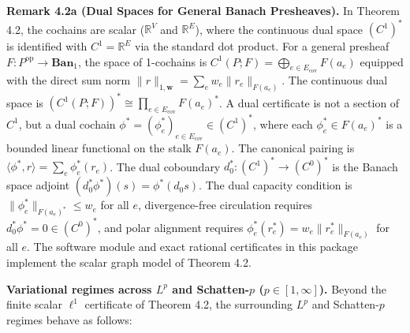\documentclass[
]{article}
\begin{document}
\textbf{Remark 4.2a (Dual Spaces for General Banach Presheaves).} In Theorem 4.2, the cochains are scalar (\(\mathbb{R}^V\) and \(\mathbb{R}^E\)), where the continuous dual space \((C^1)^*\) is identified with \(C^1 = \mathbb{R}^E\) via the standard dot product. For a general presheaf \(F: P^{\mathrm{op}} \to \mathbf{Ban}_1\), the space of 1-cochains is \(C^1(P; F) = \bigoplus_{e \in E_{\mathrm{cov}}} F(a_e)\) equipped with the direct sum norm \(\|r\|_{1,\mathbf{w}} = \sum_e w_e \|r_e\|_{F(a_e)}\). The continuous dual space is \((C^1(P; F))^* \cong \prod_{e \in E_{\mathrm{cov}}} F(a_e)^*\). A dual certificate is not a section of \(C^1\), but a dual cochain \(\phi^* = (\phi_e^*)_{e \in E_{\mathrm{cov}}} \in (C^1)^*\), where each \(\phi_e^* \in F(a_e)^*\) is a bounded linear functional on the stalk \(F(a_e)\). The canonical pairing is \(\langle \phi^*, r \rangle = \sum_{e} \phi_e^*(r_e)\). The dual coboundary \(d_0^*: (C^1)^* \to (C^0)^*\) is the Banach space adjoint \((d_0^* \phi^*)(s) = \phi^*(d_0 s)\). The dual capacity condition is \(\|\phi_e^*\|_{F(a_e)^*} \le w_e\) for all \(e\), divergence-free circulation requires \(d_0^* \phi^* = 0 \in (C^0)^*\), and polar alignment requires \(\phi_e^*(r_e^*) = w_e \|r_e^*\|_{F(a_e)}\) for all \(e\). The software module and exact rational certificates in this package implement the scalar graph model of Theorem 4.2.

\textbf{Variational regimes across \(L^p\) and Schatten-\(p\) (\(p \in [1, \infty]\)).} Beyond the finite scalar \(\ell^1\) certificate of Theorem 4.2, the surrounding \(L^p\) and Schatten-\(p\) regimes behave as follows:
\end{document}
